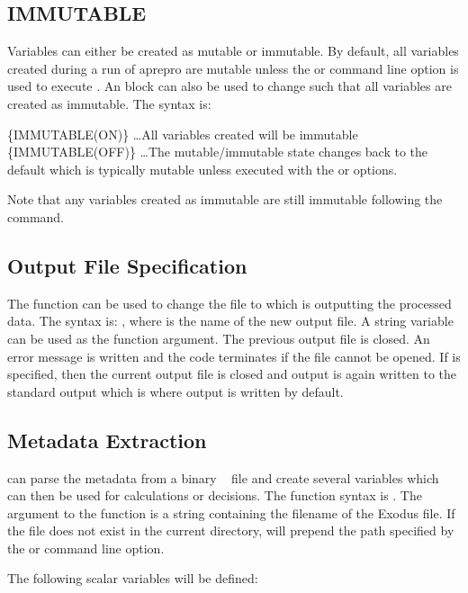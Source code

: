 \subsection{IMMUTABLE}\label{immutable_block} Variables can either be
created as mutable or immutable.  By default, all variables created
during a run of aprepro are mutable unless the  or
 command line option is used to execute \aprepro{}.  An
 block can also be used to change \aprepro{} such that
all variables are created as immutable.  The syntax is:
\begin{apinp}
\{IMMUTABLE(ON)\}
\ldots All variables created will be immutable
\{IMMUTABLE(OFF)\}
\ldots The mutable/immutable state changes back to the default which
is typically mutable unless \aprepro{} executed with the
 or  options.
\end{apinp}
Note that any variables created as immutable are still immutable
following the  command.

\subsection{Output File Specification} The  function can be used
to change the file to which \aprepro{} is outputting the processed
data.  The syntax is: , where
 is the name of the new output file. A string variable
can be used as the function argument. The previous output file is
closed. An error message is written and the code terminates if the
file cannot be opened. If  is specified,
then the current output file is closed and output is again written to
the standard output which is where output is written by default.

\subsection{\exo{} Metadata Extraction} \aprepro{} can parse the
metadata from a binary \exo{}~\cite{bib:exodus} file and create several
variables which can then be used for calculations or decisions.  The
function syntax is . The
argument to the function is a string containing the filename of the
Exodus file.  If the file does not exist in the current directory,
\aprepro{} will prepend the path specified by the  or
 command line option.

The following scalar variables will be defined:


